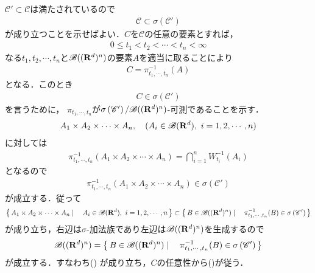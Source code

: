 	\begin{sketch}
		$\mathscr{C}' \subset \mathscr{C}$は満たされているので
		\begin{align}
			\mathscr{C} \subset \sigma\left(\mathscr{C}' \right)
			\label{eq:chapter_2_one_dimensional_cylinder_set_1}
		\end{align}
		が成り立つことを示せばよい．$C$を$\mathscr{C}$の任意の要素とすれば，
		\begin{align}
		0 \leq t_1 < t_2 < \cdots < t_n < \infty
		\end{align}
		なる$t_1,t_2,\cdots,t_n$と$\mathscr{B}((\mathbf{R}^d)^n)$の要素$A$を適当に取ることにより
		\begin{align}
			C = \pi_{t_1,\cdots,t_n}^{-1}(A)
		\end{align}
		となる．このとき
		\begin{align}
			C \in \sigma\left(\mathscr{C}' \right)
			\label{eq:chapter_2_one_dimensional_cylinder_set_2}
		\end{align}
		を言うために，
		$\pi_{t_1,\cdots,t_n}$が$\sigma\left(\mathscr{C}' \right)/\mathscr{B}((\mathbf{R}^d)^n)$-可測であることを示す．
		\begin{align}
			A_1 \times A_2 \times \cdots \times A_n,\quad (A_i \in \mathscr{B}(\mathbf{R}^d),\ i=1,2,\cdots,n)
		\end{align}
		に対しては
		\begin{align}
			\pi_{t_1,\cdots,t_n}^{-1}(A_1 \times A_2 \times \cdots \times A_n)
			= \bigcap_{i=1}^n W_{t_i}^{-1}(A_i)
		\end{align}
		となるので
		\begin{align}
			\pi_{t_1,\cdots,t_n}^{-1}(A_1 \times A_2 \times \cdots \times A_n)
			\in \sigma\left(\mathscr{C}' \right)
		\end{align}
		が成立する．従って
		\begin{align}
			\left\{\, A_1 \times A_2 \times \cdots \times A_n \mid \quad A_i \in \mathscr{B}(\mathbf{R}^d),\ i=1,2,\cdots,n\, \right\}
			\subset \left\{\, B \in \mathscr{B}((\mathbf{R}^d)^n) \mid \quad \pi_{t_1,\cdots,t_n}^{-1}(B)
			\in \sigma\left(\mathscr{C}' \right)\, \right\}
		\end{align}
		が成り立ち，右辺は$\sigma$-加法族であり左辺は$\mathscr{B}((\mathbf{R}^d)^n)$を生成するので
		\begin{align}
			\mathscr{B}((\mathbf{R}^d)^n) = 
			\left\{\, B \in \mathscr{B}((\mathbf{R}^d)^n) \mid \quad \pi_{t_1,\cdots,t_n}^{-1}(B)
			\in \sigma\left(\mathscr{C}' \right)\, \right\}
		\end{align}
		が成立する．すなわち()
		が成り立ち，$C$の任意性から()が従う．
		\QED
	\end{sketch}
	

